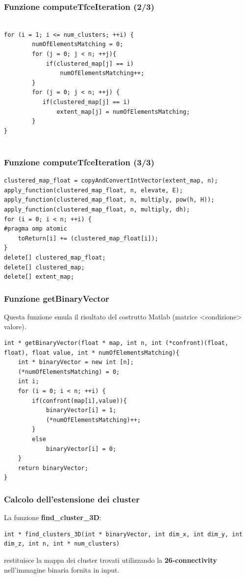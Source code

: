 \documentclass{beamer}
\begin{document}
\begin{frame}[fragile]
\frametitle{Funzione computeTfceIteration (2/3)}
\begin{center}
\begin{lstlisting}

for (i = 1; i <= num_clusters; ++i) {
		numOfElementsMatching = 0;	
		for (j = 0; j < n; ++j){
		    if(clustered_map[j] == i)
		        numOfElementsMatching++; 
		}
		for (j = 0; j < n; ++j) {
		   if(clustered_map[j] == i)
		       extent_map[j] = numOfElementsMatching; 
		}
}
		      
\end{lstlisting}
\end{center}
\end{frame}

\begin{frame}[fragile]
\frametitle{Funzione computeTfceIteration (3/3)}
\begin{center}
\begin{lstlisting}
clustered_map_float = copyAndConvertIntVector(extent_map, n);
apply_function(clustered_map_float, n, elevate, E);
apply_function(clustered_map_float, n, multiply, pow(h, H));
apply_function(clustered_map_float, n, multiply, dh);
for (i = 0; i < n; ++i) {
#pragma omp atomic
    toReturn[i] += (clustered_map_float[i]);
}
delete[] clustered_map_float;
delete[] clustered_map;
delete[] extent_map;
\end{lstlisting}
\end{center}
\end{frame}

\begin{frame}[fragile]
\frametitle{Funzione getBinaryVector}
Questa funzione emula il risultato del costrutto Matlab (matrice <condizione> valore).
\begin{center}
\begin{lstlisting}
int * getBinaryVector(float * map, int n, int (*confront)(float, float), float value, int * numOfElementsMatching){
    int * binaryVector = new int [n];
    (*numOfElementsMatching) = 0;
    int i;
    for (i = 0; i < n; ++i) {
        if(confront(map[i],value)){
            binaryVector[i] = 1;
            (*numOfElementsMatching)++;
        }
        else
            binaryVector[i] = 0;
    }
    return binaryVector;
}
\end{lstlisting}
\end{center}
\end{frame}

\begin{frame}[fragile]
\frametitle{Calcolo dell'estensione dei cluster}
La funzione \textbf{find\_cluster\_3D}:\\
\begin{lstlisting}
int * find_clusters_3D(int * binaryVector, int dim_x, int dim_y, int dim_z, int n, int * num_clusters)
\end{lstlisting}

restituisce la mappa dei cluster trovati utilizzando la \textbf{26-connectivity} nell'immagine binaria fornita in input.
\end{frame}
\end{document}
